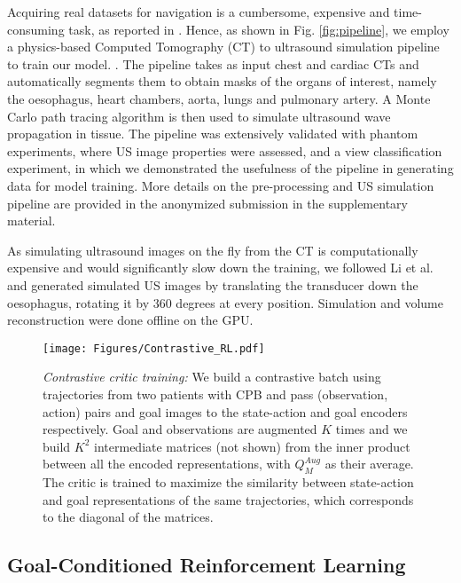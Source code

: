 Acquiring real datasets for navigation is a cumbersome, expensive and time-consuming task, as reported in \cite{Droste2020AutomaticPM,milletari_straight_2019}. Hence, as shown in Fig. \ref{fig:pipeline}, we employ a physics-based Computed Tomography (CT) to ultrasound simulation pipeline to train our model. \cite{amadou2024cardiac}. The pipeline takes as input chest and cardiac CTs and automatically segments them to obtain masks of the organs of interest, namely the oesophagus, heart chambers, aorta, lungs and pulmonary artery. A Monte Carlo path tracing algorithm is then used to simulate ultrasound wave propagation in tissue. The pipeline was extensively validated with phantom experiments, where US image properties were assessed, and a view classification experiment, in which we demonstrated the usefulness of the pipeline in generating data for model training. More details on the pre-processing and US simulation pipeline are provided in the anonymized submission in the supplementary material.

As simulating ultrasound images on the fly from the CT is computationally expensive and would significantly slow down the training, we followed Li et al. \cite{Li2023RLTEEAP} and generated simulated US images by translating the transducer down the oesophagus, rotating it by 360 degrees at every position. Simulation and volume reconstruction were done offline on the GPU. 

\begin{figure}[t!]
\centering
\texttt{[image: Figures/Contrastive\_RL.pdf]}
\caption{\textit{Contrastive critic training:} We build a contrastive batch using trajectories from two patients with CPB and pass (observation, action) pairs and goal images to the state-action and goal encoders respectively. Goal and observations are augmented $K$ times and we build $K^2$ intermediate matrices (not shown) from the inner product between all the encoded representations, with $Q_M^{Aug}$ as their average. The critic is trained to maximize the similarity between state-action and goal representations of the same trajectories, which corresponds to the diagonal of the matrices.} \label{fig:losses}
\end{figure}

\subsection{Goal-Conditioned Reinforcement Learning}


